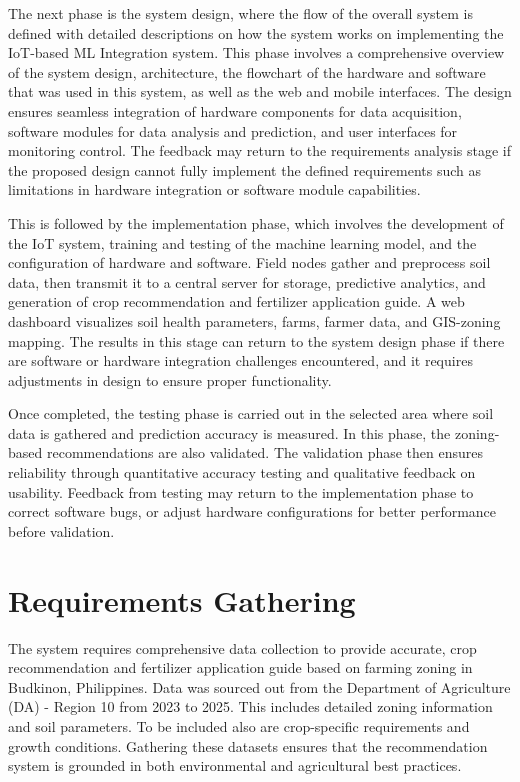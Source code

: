 {	The next phase is the system design, where the flow of the overall system is defined with detailed descriptions on how the system works on implementing the IoT-based ML Integration system.  This phase involves a comprehensive overview of the system design, architecture, the flowchart of the hardware and software that was used in this system, as well as the web and mobile interfaces. The design ensures seamless integration of hardware components for data acquisition, software modules for data analysis and prediction, and user interfaces for monitoring control. The feedback may return to the requirements analysis stage if the proposed design cannot fully implement the defined requirements such as limitations in hardware integration or software module capabilities.
	
	This is followed by the implementation phase, which involves the development of the IoT system, training and testing of the machine learning model, and the configuration of hardware and software. Field nodes gather and preprocess soil data, then transmit it to a central server for storage, predictive analytics, and generation of crop recommendation and fertilizer application guide. A web dashboard visualizes soil health parameters, farms, farmer data, and GIS-zoning mapping. The results in this stage can return to the system design phase if there are software or hardware integration challenges encountered, and it requires adjustments in design to ensure proper functionality.
	
	Once completed, the testing phase is carried out in the selected area where soil data is gathered and prediction accuracy is measured. In this phase, the zoning-based recommendations are also validated. The validation phase then ensures reliability through quantitative accuracy testing and qualitative feedback on usability. Feedback from testing may return to the implementation phase to correct software bugs, or adjust hardware configurations for better performance before validation.
	
	\section{Requirements Gathering}
	The system requires comprehensive data collection to provide accurate, crop recommendation and fertilizer application guide based on farming zoning in Budkinon, Philippines. Data was sourced out from the Department of Agriculture (DA) - Region 10 from 2023 to 2025. This includes detailed zoning information and soil parameters. To be included also are crop-specific requirements and growth conditions. Gathering these datasets ensures that the recommendation system is grounded in both environmental and agricultural best practices.
	
}
